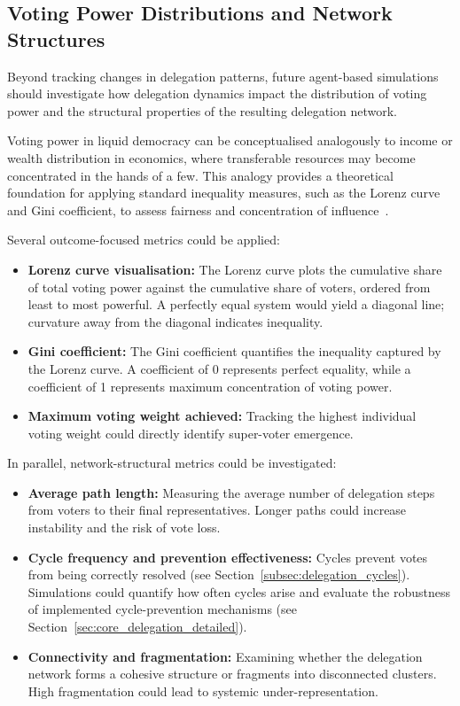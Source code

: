 \subsection{Voting Power Distributions and Network Structures}

Beyond tracking changes in delegation patterns, future agent-based simulations should investigate how delegation dynamics impact the distribution of voting power and the structural properties of the resulting delegation network.

Voting power in liquid democracy can be conceptualised analogously to income or wealth distribution in economics, where transferable resources may become concentrated in the hands of a few. This analogy provides a theoretical foundation for applying standard inequality measures, such as the Lorenz curve and Gini coefficient, to assess fairness and concentration of influence~\citep{cowell_measuring_inequality}.

Several outcome-focused metrics could be applied:

\begin{itemize}
\item \textbf{Lorenz curve visualisation:} The Lorenz curve plots the cumulative share of total voting power against the cumulative share of voters, ordered from least to most powerful. A perfectly equal system would yield a diagonal line; curvature away from the diagonal indicates inequality.
\item \textbf{Gini coefficient:} The Gini coefficient quantifies the inequality captured by the Lorenz curve. A coefficient of 0 represents perfect equality, while a coefficient of 1 represents maximum concentration of voting power.
\item \textbf{Maximum voting weight achieved:} Tracking the highest individual voting weight could directly identify super-voter emergence.
\end{itemize}

In parallel, network-structural metrics could be investigated:

\begin{itemize}
\item \textbf{Average path length:} Measuring the average number of delegation steps from voters to their final representatives. Longer paths could increase instability and the risk of vote loss.
\item \textbf{Cycle frequency and prevention effectiveness:} Cycles prevent votes from being correctly resolved (see Section~\ref{subsec:delegation_cycles}). Simulations could quantify how often cycles arise and evaluate the robustness of implemented cycle-prevention mechanisms (see Section~\ref{sec:core_delegation_detailed}).
\item \textbf{Connectivity and fragmentation:} Examining whether the delegation network forms a cohesive structure or fragments into disconnected clusters. High fragmentation could lead to systemic under-representation.
\end{itemize}

